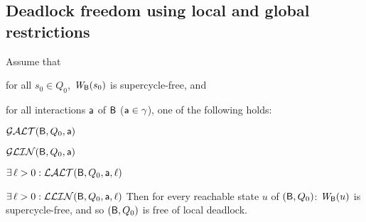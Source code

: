 











\subsection{Deadlock freedom using local and global restrictions}


\label{theorem:local.deadlock-free}
Assume that
\bn
\item \label{theorem:local.deadlock-free.initial}
      for all $s_0 \in Q_0$, $\mathit{W}_{\mathsf{B}}({s_0})$ is supercycle-free, and
\item \label{theorem:local.deadlock-free.scfPres}
      for all interactions $\mathsf{a}$ of $\mathsf{B}$ (\ie $\mathsf{a} \in \gamma$), one of
      the following holds:
      \bn
      \item $\mathcal{GALT}(\mathsf{B},Q_0,\mathsf{a})$
      \item $\mathcal{GLIN}(\mathsf{B},Q_0,\mathsf{a})$
      \item $\exists\, \ell > 0: \mathcal{LALT}(\mathsf{B},Q_0,\mathsf{a},\ell)$ 
      \item $\exists\, \ell > 0: \mathcal{LLIN}(\mathsf{B},Q_0,\mathsf{a},\ell)$ 
      \en
\en
Then for every reachable state $u$ of $(\mathsf{B}, Q_0)$:  $\mathit{W}_{\mathsf{B}}({u})$ is supercycle-free, and so 
$(\mathsf{B}, Q_0)$ is free of local deadlock.
\et
{}

